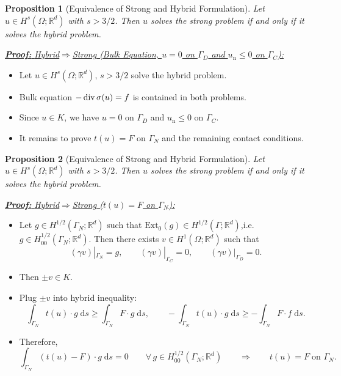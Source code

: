 \documentclass[10pt,aspectratio=169]{beamer}
\newtheorem{proposition}{Proposition}[section]
\def\R{{\mathbb R}}
\def\d{{\mathrm{d}}}
\def\ds{{\d s}}
\newcommand{\diver}{\operatornamewithlimits{div}}
\begin{document}
\begin{frame}
	\begin{proposition}[Equivalence of Strong and Hybrid Formulation]
		Let $u\in H^s(\Omega;\R^d)$ with $s>3/2$. Then $u$ solves the strong problem if and only if it solves the hybrid problem.
	\end{proposition}
	\underline{\textbf{\em Proof:} {\em Hybrid\enspace}$\Longrightarrow${\em\enspace Strong (Bulk Equation, $u = 0$ on $\Gamma_D$ and $u_\mathrm{n}\le 0$ on $\Gamma_C$):}}
	\begin{itemize}
		\item Let $u\in H^s(\Omega;\R^d),\, s>3/2$ solve the hybrid problem.
		\item Bulk equation $-\diver \sigma(u) = f$ is contained in both problems.
		\item Since $u\in K$, we have $u = 0$ on $\Gamma_D$ and $u_\mathrm{n}\le 0$ on $\Gamma_C$.
		\item It remains to prove $t(u) = F$ on $\Gamma_N$ and the remaining contact conditions.
	\end{itemize}
\end{frame}

\begin{frame}
	\begin{proposition}[Equivalence of Strong and Hybrid Formulation]
		Let $u\in H^s(\Omega;\R^d)$ with $s>3/2$. Then $u$ solves the strong problem if and only if it solves the hybrid problem.
	\end{proposition}
	\underline{\textbf{\em Proof:} {\em Hybrid\enspace}$\Longrightarrow${\em\enspace Strong ($t(u) = F$ on $\Gamma_N$):}}
	\begin{itemize}
		\item Let $g\in H^{1/2}(\Gamma_N;\R^d)$ such that $\mathrm{Ext}_0(g)\in H^{1/2}(\Gamma;\R^d)$,i.e.\ $g\in H_{00}^{1/2}(\Gamma_N;\R^d)$. Then there exists $v\in H^1(\Omega;\R^d)$ such that
		      \begin{equation*}
			      (\gamma v)|_{\Gamma_N} = g,\qquad (\gamma v)|_{\Gamma_C} = 0,\qquad (\gamma v)|_{\Gamma_D} = 0.
		      \end{equation*}
		\item Then $\pm v\in K$.
		\item Plug $\pm v$ into hybrid inequality:
		      \begin{equation*}
			      \int_{\Gamma_N}t(u)\cdot g\;\ds\ge \int_{\Gamma_N} F\cdot g\;\ds,\qquad -\int_{\Gamma_N}t(u)\cdot g\;\ds\ge -\int_{\Gamma_N} F\cdot f\;\ds.
		      \end{equation*}
		\item Therefore,
		      \begin{equation*}
			      \int_{\Gamma_N}(t(u)- F)\cdot g\;\ds  = 0\qquad \forall\, g\in H_{00}^{1/2}(\Gamma_N;\R^d)\qquad \Longrightarrow\qquad t(u) = F\;\text{on }\Gamma_N.
		      \end{equation*}
	\end{itemize}
\end{frame}
\end{document}
